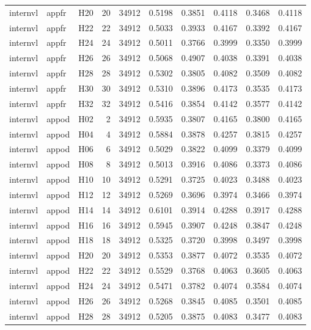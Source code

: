\begin{table}[tbp]
\begin{tabular}{lllrrrrrrr}
internvl & appfr & H20 & 20 & 34912 & 0.5198 & 0.3851 & 0.4118 & 0.3468 & 0.4118 \\
internvl & appfr & H22 & 22 & 34912 & 0.5033 & 0.3933 & 0.4167 & 0.3392 & 0.4167 \\
internvl & appfr & H24 & 24 & 34912 & 0.5011 & 0.3766 & 0.3999 & 0.3350 & 0.3999 \\
internvl & appfr & H26 & 26 & 34912 & 0.5068 & 0.4907 & 0.4038 & 0.3391 & 0.4038 \\
internvl & appfr & H28 & 28 & 34912 & 0.5302 & 0.3805 & 0.4082 & 0.3509 & 0.4082 \\
internvl & appfr & H30 & 30 & 34912 & 0.5310 & 0.3896 & 0.4173 & 0.3535 & 0.4173 \\
internvl & appfr & H32 & 32 & 34912 & 0.5416 & 0.3854 & 0.4142 & 0.3577 & 0.4142 \\
internvl & appod & H02 & 2 & 34912 & 0.5935 & 0.3807 & 0.4165 & 0.3800 & 0.4165 \\
internvl & appod & H04 & 4 & 34912 & 0.5884 & 0.3878 & 0.4257 & 0.3815 & 0.4257 \\
internvl & appod & H06 & 6 & 34912 & 0.5029 & 0.3822 & 0.4099 & 0.3379 & 0.4099 \\
internvl & appod & H08 & 8 & 34912 & 0.5013 & 0.3916 & 0.4086 & 0.3373 & 0.4086 \\
internvl & appod & H10 & 10 & 34912 & 0.5291 & 0.3725 & 0.4023 & 0.3488 & 0.4023 \\
internvl & appod & H12 & 12 & 34912 & 0.5269 & 0.3696 & 0.3974 & 0.3466 & 0.3974 \\
internvl & appod & H14 & 14 & 34912 & 0.6101 & 0.3914 & 0.4288 & 0.3917 & 0.4288 \\
internvl & appod & H16 & 16 & 34912 & 0.5945 & 0.3907 & 0.4248 & 0.3847 & 0.4248 \\
internvl & appod & H18 & 18 & 34912 & 0.5325 & 0.3720 & 0.3998 & 0.3497 & 0.3998 \\
internvl & appod & H20 & 20 & 34912 & 0.5353 & 0.3877 & 0.4072 & 0.3535 & 0.4072 \\
internvl & appod & H22 & 22 & 34912 & 0.5529 & 0.3768 & 0.4063 & 0.3605 & 0.4063 \\
internvl & appod & H24 & 24 & 34912 & 0.5471 & 0.3782 & 0.4074 & 0.3584 & 0.4074 \\
internvl & appod & H26 & 26 & 34912 & 0.5268 & 0.3845 & 0.4085 & 0.3501 & 0.4085 \\
internvl & appod & H28 & 28 & 34912 & 0.5205 & 0.3875 & 0.4083 & 0.3477 & 0.4083 \\

\end{tabular}
\end{table}
